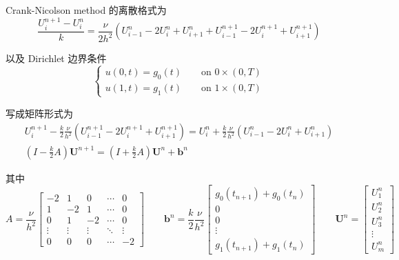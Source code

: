 \documentclass[a4paper]{article}
\begin{document}
\par Crank-Nicolson method 的离散格式为
\begin{equation}
    \frac{U_{i}^{n+1}-U_{i}^{n}}{k} 
    = \frac{\nu}{2h^2}
    \left(
        U_{i-1}^{n}-2U_{i}^{n}+U_{i+1}^{n}
        +U_{i-1}^{n+1}-2U_{i}^{n+1}+U_{i+1}^{n+1}
    \right)
\end{equation}
\par 以及 Dirichlet 边界条件
\begin{equation}
    \begin{cases}
        u(0,t)=g_0(t)\qquad \text{on } {0} \times (0,T)\\
        u(1,t)=g_1(t)\qquad \text{on } {1} \times (0,T)
    \end{cases}
\end{equation}
\par 写成矩阵形式为
\begin{equation}
    \begin{gathered}
        U_{i}^{n+1} - \frac{k}{2}\frac{\nu}{h^2}
        \left(
            U_{i-1}^{n+1}-2U_{i}^{n+1}+U_{i+1}^{n+1}
        \right)
        = U_{i}^{n} + \frac{k}{2}\frac{\nu}{h^2}
        \left(
            U_{i-1}^{n}-2U_{i}^{n}+U_{i+1}^{n}
        \right)\\
        \left(
            I - \frac{k}{2}A
        \right)\mathbf{U}^{n+1} = \left(
            I + \frac{k}{2}A
        \right)\mathbf{U}^{n} + \mathbf{b}^{n}
    \end{gathered}
\end{equation}
\par 其中
\begin{equation}
    A = \frac{\nu}{h^2}
    \begin{bmatrix}
        -2 & 1 & 0 & \cdots & 0\\
        1 & -2 & 1 & \cdots & 0\\
        0 & 1 & -2 & \cdots & 0\\
        \vdots & \vdots & \vdots & \ddots & \vdots\\
        0 & 0 & 0 & \cdots & -2
    \end{bmatrix}\qquad
    \mathbf{b}^{n} = 
    \frac{k}{2}\frac{\nu}{h^2}
    \begin{bmatrix}
        g_0(t_{n+1}) + g_0(t_n)\\
        0\\
        0\\
        \vdots\\
        g_1(t_{n+1}) + g_1(t_n)
    \end{bmatrix}\qquad
    \mathbf{U}^{n} =
    \begin{bmatrix}
        U_1^{n}\\
        U_2^{n}\\
        U_3^{n}\\
        \vdots\\
        U_{m}^{n}
    \end{bmatrix}
\end{equation}
\end{document}
